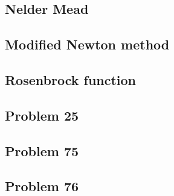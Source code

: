 \subsection*{Nelder Mead}


\clearpage
\subsection*{Modified Newton method}


\clearpage
\subsection*{Rosenbrock function}


\clearpage
\subsection*{Problem 25}


\clearpage
\subsection*{Problem 75}


\clearpage
\subsection*{Problem 76}


